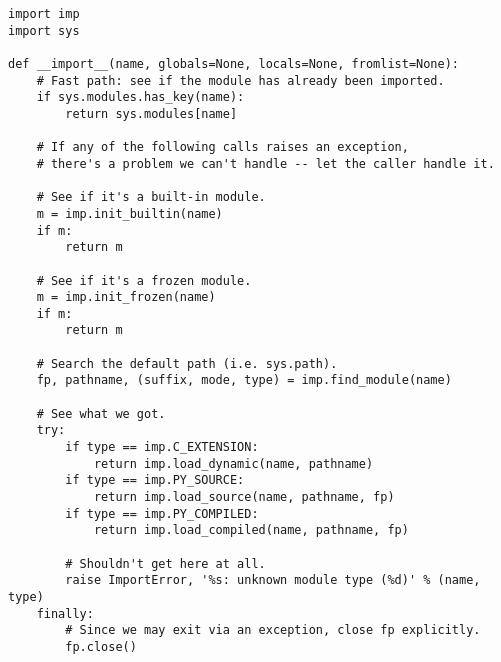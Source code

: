 \begin{verbatim}
import imp
import sys

def __import__(name, globals=None, locals=None, fromlist=None):
    # Fast path: see if the module has already been imported.
    if sys.modules.has_key(name):
        return sys.modules[name]

    # If any of the following calls raises an exception,
    # there's a problem we can't handle -- let the caller handle it.

    # See if it's a built-in module.
    m = imp.init_builtin(name)
    if m:
        return m

    # See if it's a frozen module.
    m = imp.init_frozen(name)
    if m:
        return m

    # Search the default path (i.e. sys.path).
    fp, pathname, (suffix, mode, type) = imp.find_module(name)

    # See what we got.
    try:
        if type == imp.C_EXTENSION:
            return imp.load_dynamic(name, pathname)
        if type == imp.PY_SOURCE:
            return imp.load_source(name, pathname, fp)
        if type == imp.PY_COMPILED:
            return imp.load_compiled(name, pathname, fp)

        # Shouldn't get here at all.
        raise ImportError, '%s: unknown module type (%d)' % (name, type)
    finally:
        # Since we may exit via an exception, close fp explicitly.
        fp.close()
\end{verbatim}
